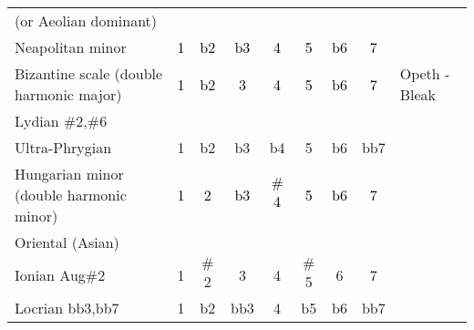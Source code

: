 \begin{table*}[!h]
\begin{adjustwidth}{-2.5cm}{}
\begin{tabular}{l|ccc cccc|l}
		(or Aeolian dominant) & & & &   & & & &\\
		Neapolitan minor                   & \textcolor{black}{1} 
													  & \textcolor{black}{b2} 
													  & \textcolor{black}{b3} 
													  & \textcolor{black}{4} 
													  & \textcolor{black}{5}  
													  & \textcolor{black}{b6} 
													  & \textcolor{black}{7} &\\                                                                                
		\hline 
		Bizantine scale (double harmonic major)      & \textcolor{black}{1} 
													  & \textcolor{black}{b2} 
													  & \textcolor{black}{3} 
													  & \textcolor{black}{4} 
													  & \textcolor{black}{5}  
													  & \textcolor{black}{b6} 
													  & \textcolor{black}{7} & Opeth - Bleak\\
	    Lydian $\#$2,$\#$6                           & & & & & & & \\
	    Ultra-Phrygian                               &1 &b2 &b3 &b4 &5 &b6 &bb7 \\
		Hungarian minor (double harmonic minor)      & \textcolor{black}{1} 
													  & \textcolor{black}{2} 
													  & \textcolor{black}{b3} 
													  & \textcolor{black}{$\#$4} 
													  & \textcolor{black}{5}  
													  & \textcolor{black}{b6} 
													  & \textcolor{black}{7} & \\ 
	    Oriental (Asian)                             & & & & & & & \\
	    Ionian Aug$\#$2                             & 1&$\#$2 &3 &4 &$\#$5 &6 &7 \\
	    Locrian bb3,bb7                             & 1 &b2 &bb3 &4 &b5 &b6 &bb7 \\
		\hline 
	\end{tabular}
	\label{tab: }
	\end{adjustwidth}
\end{table*}
